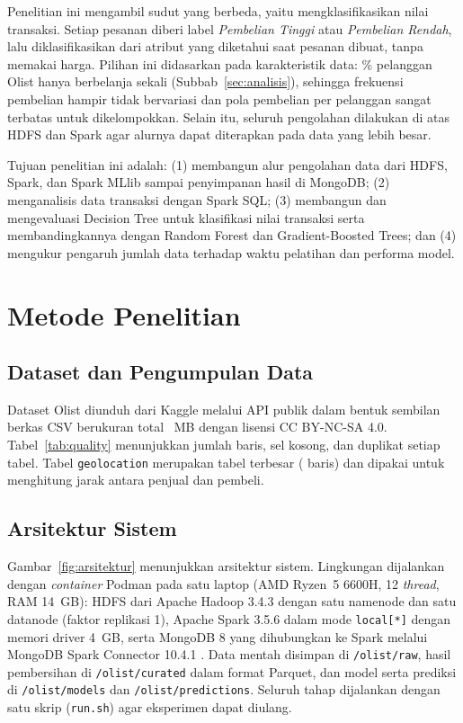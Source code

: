 \documentclass[11pt,a4paper]{article}
\newcommand{\tabel}[3]{%
  \begin{table}[tbp]\centering\caption{#2}\label{#3}\small\adjustbox{max width=\textwidth}{}\end{table}}
\newcommand{\f}[1]{\texttt{#1}}
\begin{document}
Penelitian ini mengambil sudut yang berbeda, yaitu mengklasifikasikan nilai transaksi.
Setiap pesanan diberi label \emph{Pembelian Tinggi} atau \emph{Pembelian Rendah}, lalu
diklasifikasikan dari atribut yang diketahui saat pesanan dibuat, tanpa memakai harga.
Pilihan ini didasarkan pada karakteristik data: \oneTimePct\% pelanggan Olist hanya
berbelanja sekali (Subbab~\ref{sec:analisis}), sehingga frekuensi pembelian hampir tidak
bervariasi dan pola pembelian per pelanggan sangat terbatas untuk dikelompokkan. Selain itu, seluruh
pengolahan dilakukan di atas HDFS dan Spark agar alurnya dapat diterapkan pada data yang
lebih besar.

Tujuan penelitian ini adalah: (1) membangun alur pengolahan data dari HDFS, Spark, dan
Spark MLlib sampai penyimpanan hasil di MongoDB; (2) menganalisis data transaksi dengan
Spark SQL; (3) membangun dan mengevaluasi Decision Tree untuk klasifikasi nilai
transaksi serta membandingkannya dengan Random Forest dan Gradient-Boosted Trees; dan
(4) mengukur pengaruh jumlah data terhadap waktu pelatihan dan performa model.

\section{Metode Penelitian}
\subsection{Dataset dan Pengumpulan Data}
Dataset Olist \cite{olist2018} diunduh dari Kaggle melalui API publik dalam bentuk
sembilan berkas CSV berukuran total \rawSizeMB{}~MB dengan lisensi CC BY-NC-SA 4.0.
Tabel~\ref{tab:quality} menunjukkan jumlah baris, sel kosong, dan duplikat
setiap tabel. Tabel \f{geolocation} merupakan tabel terbesar (\rowsGeolocation{} baris)
dan dipakai untuk menghitung jarak antara penjual dan pembeli.
\tabel{data_quality}{Profil dataset mentah.}{tab:quality}

\subsection{Arsitektur Sistem}
Gambar~\ref{fig:arsitektur} menunjukkan arsitektur sistem. Lingkungan dijalankan dengan
\emph{container} Podman pada satu laptop (AMD Ryzen~5 6600H, 12 \emph{thread}, RAM
14~GB): HDFS dari Apache Hadoop 3.4.3 dengan satu namenode dan satu datanode (faktor
replikasi 1), Apache Spark 3.5.6 dalam mode \f{local[*]} dengan memori driver 4~GB,
serta MongoDB 8 yang dihubungkan ke Spark melalui MongoDB Spark Connector 10.4.1
\cite{mongodbconnector}. Data mentah disimpan di \f{/olist/raw}, hasil pembersihan di
\f{/olist/curated} dalam format Parquet, dan model serta prediksi di
\f{/olist/models} dan \f{/olist/predictions}. Seluruh tahap dijalankan dengan satu
skrip (\f{run.sh}) agar eksperimen dapat diulang.
\end{document}
